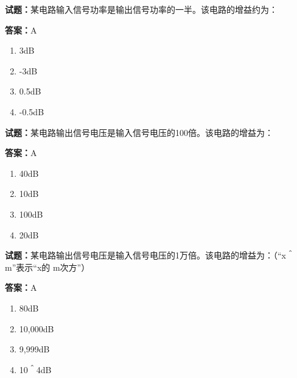 \documentclass{ctexbook}
\begin{document}




\vspace{1em}

\textbf{试题：}某电路输入信号功率是输出信号功率的一半。该电路的增益约为： 

\textbf{答案：}A 

\begin{enumerate}[leftmargin=3em]
  \item 3dB 

  \item -3dB 

  \item 0.5dB 

  \item -0.5dB 

\end{enumerate}





\vspace{1em}

\textbf{试题：}某电路输出信号电压是输入信号电压的100倍。该电路的增益为： 

\textbf{答案：}A 

\begin{enumerate}[leftmargin=3em]
  \item 40dB 

  \item 10dB 

  \item 100dB 

  \item 20dB 

\end{enumerate}





\vspace{1em}

\textbf{试题：}某电路输出信号电压是输入信号电压的1万倍。该电路的增益为：（“x＾m”表示“x的
m次方”） 

\textbf{答案：}A 

\begin{enumerate}[leftmargin=3em]
  \item 80dB 


  \item 10,000dB 

  \item 9,999dB 

  \item 10＾4dB 

\end{enumerate}
\end{document}
